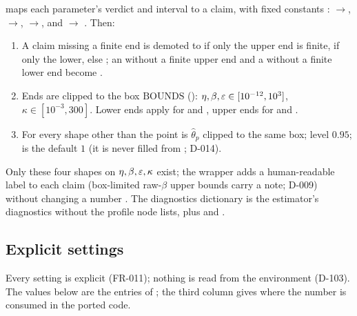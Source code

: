   maps each parameter's verdict and interval to a claim,
with fixed constants : $\to$,
$\to$, $\to$,  and
$\to$ . Then:
\begin{enumerate}[nosep]
  \item A  claim missing a finite end is demoted to  if only the upper end is
    finite,  if only the lower, else ; an  without a finite upper end
    and a  without a finite lower end become .
  \item Ends are clipped to the box $\mathrm{BOUNDS}$ (): $\eta,\beta,\varepsilon\in[10^{-12},10^3]$,
    $\kappa\in[10^{-3},300]$. Lower ends apply for  and , upper ends for
     and .
  \item For every shape other than  the point is $\hat\theta_p$ clipped to the same box; level $0.95$;
     is the  default $1$ (it is never filled from ; D-014).
\end{enumerate}
Only these four shapes on $\eta,\beta,\varepsilon,\kappa$ exist; the wrapper adds a human-readable label to each claim
(box-limited raw-$\beta$ upper bounds carry a note; D-009) without changing a number
. The diagnostics dictionary is the estimator's diagnostics without the
profile node lists, plus  and .

\subsection{Explicit settings}\label{sec:pv-settings}

Every setting is explicit (FR-011); nothing is read from the environment (D-103). The values below are the
entries of  ; the third column gives where the
number is consumed in the ported code.

